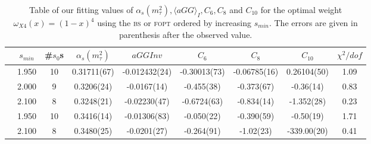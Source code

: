 \documentclass[../../index.tex]{subfiles}
\begin{document}
\begin{table}
  \centering
  \begin{adjustbox}{width=\textwidth}
    \begin{tabular}{ccccccccc}
      \toprule
      & \(s_{min}\) & \#\(s_0\)s & \(\alpha_s(m_\tau^2)\) & \(aGGInv\) & \(C_{6}\) & \(C_{8}\) & \(C_{10}\) & \(\chi^2/dof\)  \\
      \midrule
      \parbox[t]{2mm}{}
      & 1.950 & 10 & 0.31711(67) & -0.012432(24) & -0.30013(73) & -0.06785(16) & 0.26104(50) & 1.09 \\
      & 2.000 & 9 & 0.3206(24) & -0.0167(14) & -0.455(38) & -0.373(67) & -0.36(14) & 0.83 \\
      & 2.100 & 8 & 0.3248(21) & -0.02230(47) & -0.6724(63) & -0.834(14) & -1.352(28) & 0.23 \\
      \midrule
      \parbox[t]{2mm}{}
      & 1.950 & 10 & 0.3416(14) & -0.01306(83) & -0.050(22) & -0.390(59) & -0.50(19) & 1.71 \\
      & 2.100 & 8 & 0.3480(25) & -0.0201(27) & -0.264(91) & -1.02(23) & -339.00(20) & 0.41 \\
      \bottomrule
    \end{tabular}
  \end{adjustbox}
  \caption{Table of our fitting values of \(\alpha_s(m_\tau^2), \langle aGG
    \rangle_I, C_6, C_8\) and \(C_{10}\) for the optimal weight
    \(\omega_{X4}(x)=(1-x)^4\) using the \textsc{bs} or \textsc{fopt} ordered by
    increasing \(s_{min}\). The errors are given in parenthesis after the
    observed value.}
  \label{table:fitOpt40AlD4D6D8D10}
\end{table}
\end{document}
